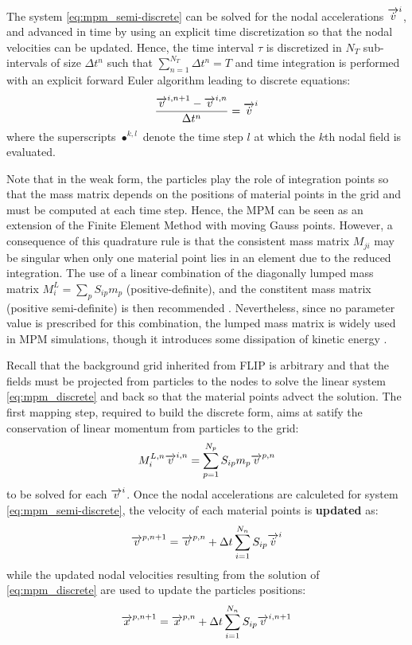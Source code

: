 The system \eqref{eq:mpm_semi-discrete} can be solved for the nodal accelerations ${\overrightarrow{\dot{v}}}^i$, and advanced in time by using an explicit time discretization so that the nodal velocities can be updated. Hence, the time interval $\tau$ is discretized in $N_T$ sub-intervals of size $\Delta t^n$ such that $\sum_{n=1}^{N_T} \Delta t^n = T$ and time integration is performed with an explicit forward Euler algorithm leading to discrete equations:
\begin{equation}
  \label{eq:mpm_discrete}
  \frac{{\overrightarrow{v}}^{i,n+1}-{\overrightarrow{v}}^{i,n}}{\Delta t^n} = {\overrightarrow{\dot{v}}}^i
\end{equation}
where the superscripts $\bullet^{k,l}$ denote the time step $l$ at which the $k$th nodal field is evaluated. 

Note that in the weak form, the particles play the role of integration points so that the mass matrix depends on the positions of material points in the grid and must be computed at each time step. Hence, the MPM can be seen as an extension of the Finite Element Method with moving Gauss points. However, a consequence of this quadrature rule is that the consistent mass matrix $M_{ji}$ may be singular when only one material point lies in an element due to the reduced integration. The use of a linear combination of the diagonally lumped mass matrix $M^L_i=\sum_p S_{ip}m_p$ (positive-definite), and the constitent mass matrix (positive semi-definite) is then recommended \cite{Love}. Nevertheless, since no parameter value is prescribed for this combination, the lumped mass matrix is widely used in MPM simulations, though it introduces some dissipation of kinetic energy \cite{Mass_Flip}.  

Recall that the background grid inherited from FLIP is arbitrary and that the fields must be projected from particles to the nodes to solve the linear system \eqref{eq:mpm_discrete} and back so that the material points advect the solution. The first mapping step, required to build the discrete form,
aims at satify the conservation of linear momentum from particles to the grid:
\begin{equation}
  \label{eq:particles2nodes}
  M^{L,n}_i {\overrightarrow{v}}^{i,n} = \sum_{p=1}^{N_p} S_{ip}m_p {\overrightarrow{v}}^{p,n}
\end{equation}
to be solved for each ${\overrightarrow{v}}^i$. Once the nodal accelerations are calculeted for system \eqref{eq:mpm_semi-discrete}, the velocity of each material points is \textbf{updated} as:
\begin{equation}
  \label{eq:mp_velocity_update}
  {\overrightarrow{v}}^{p,n+1}= {\overrightarrow{v}}^{p,n}+ \Delta t\sum_{i=1}^{N_n} S_{ip}{\overrightarrow{\dot{v}}}^{i}
\end{equation}
while the updated nodal velocities resulting from the solution of \eqref{eq:mpm_discrete} are used to update the particles positions:
\begin{equation}
  \label{eq:position_update}
  {\overrightarrow{x}}^{p,n+1}={\overrightarrow{x}}^{p,n} + \Delta t\sum_{i=1}^{N_n} S_{ip}{\overrightarrow{v}}^{i,n+1} 
\end{equation}

